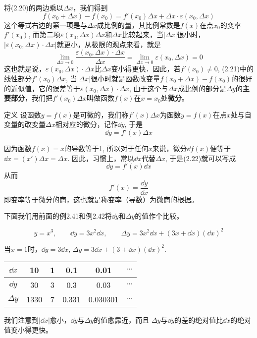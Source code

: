 将(2.20)的两边乘以$\Delta x$，我们得到
\begin{equation}
    f(x_0+\Delta x)-f(x_0)=f'(x_0)\Delta x+\Delta x\cdot \varepsilon(x_0,\Delta x)
\end{equation}
这个等式右边的第一项是与$\Delta x$成比例的量，其比例常数是$f(x)$在点$x_0$的变率$f'(x_0)$, 而第二项$\varepsilon(x_0,\Delta x)\Delta x$和$\Delta x$比较起来，当$|\Delta x|$很小时，$|\varepsilon(x_0,\Delta x)\cdot \Delta x|$就更小，从极限的观点来看，就是
\[\lim_{\Delta x\to 0} \frac{\varepsilon(x_0,\Delta x)\cdot \Delta x}{\Delta x} =\lim_{\Delta x\to 0}\varepsilon(x_0,\Delta x)   =0\]
这也就是说，$\varepsilon(x_0,\Delta x)\cdot \Delta x$比$\Delta x$变小得更快．因此，若$f'(x_0)\ne 0$, (2.21)中的线性部分$f'(x_0)\Delta x$, 当$|\Delta x|$很小时就是函数改变量$f(x_0+\Delta x)-f(x_0)$的很好的近似值，它的误差等于$\varepsilon(x_0,\Delta x)\cdot \Delta x$, 由于这个与$\Delta x$成比例的部分是$\Delta y$的\textbf{主要部分}，我们把$f'(x_0)\Delta x$叫做函数$f(x)$在$x=x_0$处\textbf{微分}。

\begin{blk}
    {定义} 设函数$y=f(x)$是可微的，我们称$f'(x)\Delta x$为函数$y=f(x)$在点$x$处与自变量的改变量$\Delta x$相对应的微分，记作$\dd y$, 于是
\begin{equation}
   \dd y=f' (x) \Delta x 
\end{equation}
\end{blk}

因为函数$f(x)=x$的导数等于1, 所以对于任何$x$来说，微分$\dd f(x)$便等于$\dd x=(x')\Delta x=\Delta x$. 因此，习惯上，常以$\dd x$代替$\Delta x$, 于是(2.22)就可以写成
\begin{equation}
    \dd y=f'(x)\dd x
\end{equation}
从而
\[f' (x) =\frac{\dd y}{\dd x}\]
即变率等于微分的商，这也就是称变率（导数）为微商的根据。

下面我们用前面的例2.41和例2.42将$\dd y$和$\Delta y$的值作个比较。


\begin{example}
\[y=x^3,\qquad \dd y=3x^2\dd x,\qquad \Delta y=3x^2\dd x+(3x+\dd x)(\dd x)^2\]

当$x=1$时，$\dd y=3\dd x$, $\Delta y=3\dd x+(3+\dd x)(\dd x)^2$.

\begin{center}
\begin{tabular}{cccccc}
    \hline
$\dd x$ & 10& 1& 0.1 & 0.01& $\cdots$\\
    \hline
$\dd y$& 30&3&0.3& 0.03&$\cdots$\\
\hline
$\Delta y$& 1330& 7&0.331&0.030301&$\cdots$\\
    \hline
\end{tabular}
\end{center}
我们注意到$|\dd x|$愈小，$\dd y$与$\Delta y$的值愈靠近，而且 $\Delta y$与$\dd y$的差的绝对值比$\dd x$的绝对值变小得更快。
\end{example}

